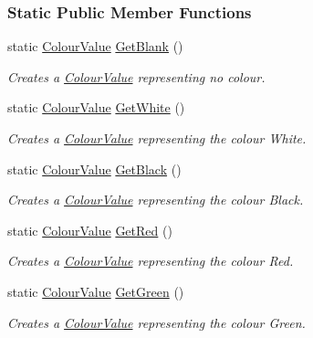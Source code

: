 \subsubsection*{Static Public Member Functions}
\begin{DoxyCompactItemize}
\item 
static \hyperlink{classphys_1_1ColourValue}{ColourValue} \hyperlink{classphys_1_1ColourValue_a80d899e82d1151487254b5c31a098a44}{GetBlank} ()
\begin{DoxyCompactList}\small\item\em Creates a \hyperlink{classphys_1_1ColourValue}{ColourValue} representing no colour. \item\end{DoxyCompactList}\item 
static \hyperlink{classphys_1_1ColourValue}{ColourValue} \hyperlink{classphys_1_1ColourValue_a77d1204bea0f2f07338d46317d644f6b}{GetWhite} ()
\begin{DoxyCompactList}\small\item\em Creates a \hyperlink{classphys_1_1ColourValue}{ColourValue} representing the colour White. \item\end{DoxyCompactList}\item 
static \hyperlink{classphys_1_1ColourValue}{ColourValue} \hyperlink{classphys_1_1ColourValue_af2f2d5ee05d17baf526d519b239c1f32}{GetBlack} ()
\begin{DoxyCompactList}\small\item\em Creates a \hyperlink{classphys_1_1ColourValue}{ColourValue} representing the colour Black. \item\end{DoxyCompactList}\item 
static \hyperlink{classphys_1_1ColourValue}{ColourValue} \hyperlink{classphys_1_1ColourValue_ada0b48c5bedd42446f9d2dc202c7b226}{GetRed} ()
\begin{DoxyCompactList}\small\item\em Creates a \hyperlink{classphys_1_1ColourValue}{ColourValue} representing the colour Red. \item\end{DoxyCompactList}\item 
static \hyperlink{classphys_1_1ColourValue}{ColourValue} \hyperlink{classphys_1_1ColourValue_abe2c8f2cb0a609af18238fec49630a78}{GetGreen} ()
\begin{DoxyCompactList}\small\item\em Creates a \hyperlink{classphys_1_1ColourValue}{ColourValue} representing the colour Green. \item\end{DoxyCompactList}\item 

\end{DoxyCompactItemize}
